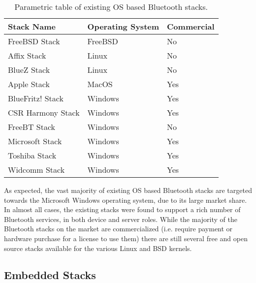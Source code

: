 \begin{table}[H]
	\begin{center}
		\begin{tabular}{ | l | l | l |}
			\hline
			\textbf{Stack Name}	& \textbf{Operating System}	& \textbf{Commercial} \\ \hline

			FreeBSD Stack		& FreeBSD	& No	\\ \hline
			Affix Stack			& Linux		& No	\\ \hline
			BlueZ Stack			& Linux		& No	\\ \hline
			Apple Stack			& MacOS		& Yes	\\ \hline
			BlueFritz! Stack	& Windows	& Yes	\\ \hline
			CSR Harmony Stack	& Windows	& Yes	\\ \hline
			FreeBT Stack 		& Windows	& No	\\ \hline
			Microsoft Stack		& Windows	& Yes	\\ \hline
			Toshiba Stack		& Windows	& Yes	\\ \hline
			Widcomm Stack		& Windows	& Yes	\\ \hline
		\end{tabular}
		\caption[Existing operating system Bluetooth stacks]{Parametric table of existing OS based Bluetooth stacks.}
		\label{tab:osbtstacks}
	\end{center}
\end{table}

As expected, the vast majority of existing OS based Bluetooth stacks are targeted towards the Microsoft Windows operating system, due to its large market share. In almost all cases, the existing stacks were found to support a rich number of Bluetooth services, in both device and server roles. While the majority of the Bluetooth stacks on the market are commercialized (i.e. require payment or hardware purchase for a license to use them) there are still several free and open source stacks available for the various Linux and BSD kernels.

\subsection{Embedded Stacks}

